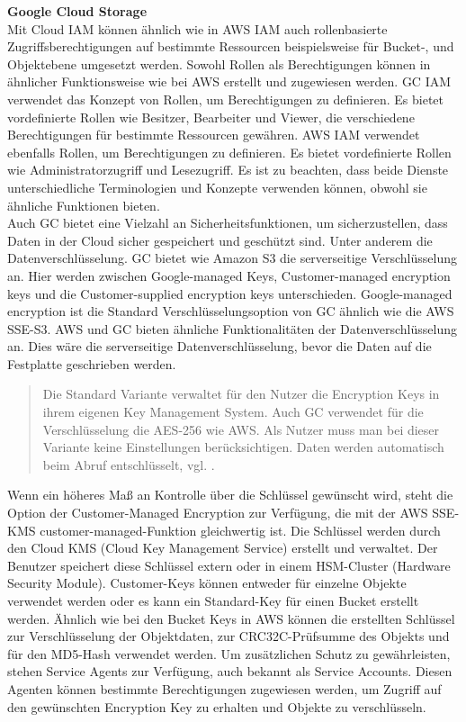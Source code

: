 \textbf{Google Cloud Storage}\\

Mit Cloud IAM können ähnlich wie in AWS IAM auch rollenbasierte Zugriffsberechtigungen auf bestimmte Ressourcen beispielsweise für Bucket-, und Objektebene umgesetzt werden. Sowohl Rollen als Berechtigungen können in ähnlicher Funktionsweise wie bei AWS erstellt und zugewiesen werden. GC IAM verwendet das Konzept von Rollen, um Berechtigungen zu definieren. Es bietet vordefinierte Rollen wie Besitzer, Bearbeiter und Viewer, die verschiedene Berechtigungen für bestimmte Ressourcen gewähren. AWS IAM verwendet ebenfalls Rollen, um Berechtigungen zu definieren. Es bietet vordefinierte Rollen wie Administratorzugriff und Lesezugriff. Es ist zu beachten, dass beide Dienste unterschiedliche Terminologien und Konzepte verwenden können, obwohl sie ähnliche Funktionen bieten.\\

Auch GC bietet eine Vielzahl an Sicherheitsfunktionen, um sicherzustellen, dass Daten in der Cloud sicher gespeichert und geschützt sind. Unter anderem die Datenverschlüsselung. GC bietet wie Amazon S3 die serverseitige Verschlüsselung an. Hier werden zwischen Google-managed Keys, Customer-managed encryption keys und die Customer-supplied encryption keys unterschieden. Google-managed encryption ist die Standard Verschlüsselungsoption von GC ähnlich wie die AWS SSE-S3. AWS und GC bieten ähnliche Funktionalitäten der Datenverschlüsselung an. Dies wäre die serverseitige Datenverschlüsselung, bevor die Daten auf die Festplatte geschrieben werden. 

\begin{quote}
	Die Standard Variante verwaltet für den Nutzer die Encryption Keys in ihrem eigenen Key Management System. Auch GC verwendet für die Verschlüsselung die AES-256 wie AWS. Als Nutzer muss man bei dieser Variante keine Einstellungen berücksichtigen. Daten werden automatisch beim Abruf entschlüsselt, vgl. \cite{gcp-encrypt}.
\end{quote}

Wenn ein höheres Maß an Kontrolle über die Schlüssel gewünscht wird, steht die Option der Customer-Managed Encryption zur Verfügung, die mit der AWS SSE-KMS customer-managed-Funktion gleichwertig ist. Die Schlüssel werden durch den Cloud KMS (Cloud Key Management Service) erstellt und verwaltet. Der Benutzer speichert diese Schlüssel extern oder in einem HSM-Cluster (Hardware Security Module). Customer-Keys können entweder für einzelne Objekte verwendet werden oder es kann ein Standard-Key für einen Bucket erstellt werden. Ähnlich wie bei den Bucket Keys in AWS können die erstellten Schlüssel zur Verschlüsselung der Objektdaten, zur CRC32C-Prüfsumme des Objekts und für den MD5-Hash verwendet werden. Um zusätzlichen Schutz zu gewährleisten, stehen Service Agents zur Verfügung, auch bekannt als Service Accounts. Diesen Agenten können bestimmte Berechtigungen zugewiesen werden, um Zugriff auf den gewünschten Encryption Key zu erhalten und Objekte zu verschlüsseln.\\


